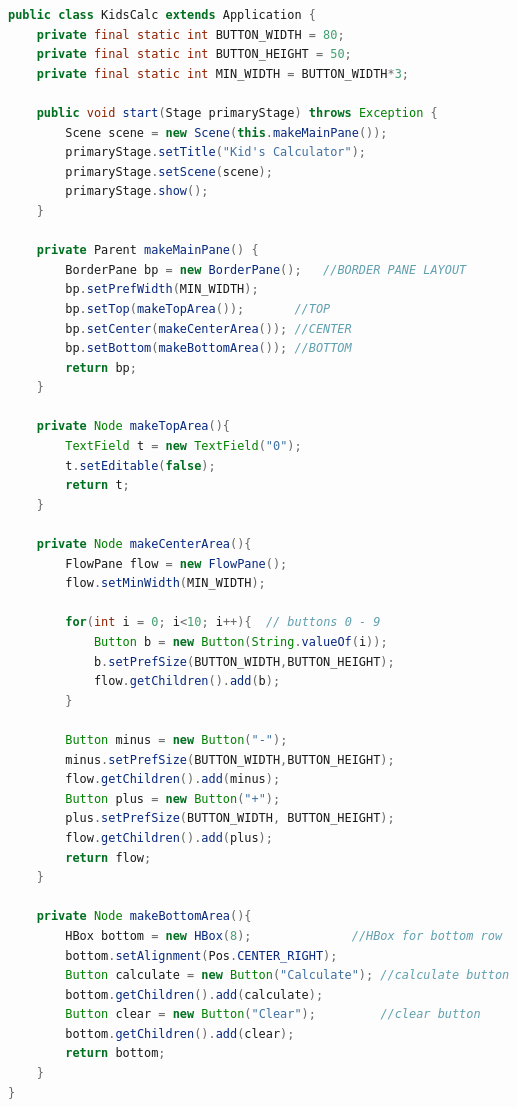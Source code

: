\vspace{-48pt}
\begin{answer}
\begin{lstlisting}[language=java,basicstyle=\scriptsize]
public class KidsCalc extends Application {
    private final static int BUTTON_WIDTH = 80;
    private final static int BUTTON_HEIGHT = 50;
    private final static int MIN_WIDTH = BUTTON_WIDTH*3;

    public void start(Stage primaryStage) throws Exception {
        Scene scene = new Scene(this.makeMainPane());
        primaryStage.setTitle("Kid's Calculator");
        primaryStage.setScene(scene);
        primaryStage.show();
    }

    private Parent makeMainPane() {
        BorderPane bp = new BorderPane();	//BORDER PANE LAYOUT
        bp.setPrefWidth(MIN_WIDTH);
        bp.setTop(makeTopArea()); 		//TOP
        bp.setCenter(makeCenterArea());	//CENTER
        bp.setBottom(makeBottomArea());	//BOTTOM
        return bp;
    }

    private Node makeTopArea(){
        TextField t = new TextField("0");
        t.setEditable(false);
        return t;
    }

    private Node makeCenterArea(){
        FlowPane flow = new FlowPane();
        flow.setMinWidth(MIN_WIDTH);
        
        for(int i = 0; i<10; i++){	// buttons 0 - 9
            Button b = new Button(String.valueOf(i));
            b.setPrefSize(BUTTON_WIDTH,BUTTON_HEIGHT);
            flow.getChildren().add(b);
        }
        
        Button minus = new Button("-"); 
        minus.setPrefSize(BUTTON_WIDTH,BUTTON_HEIGHT);
        flow.getChildren().add(minus);
        Button plus = new Button("+");
        plus.setPrefSize(BUTTON_WIDTH, BUTTON_HEIGHT);
        flow.getChildren().add(plus);
        return flow;
    }

    private Node makeBottomArea(){
        HBox bottom = new HBox(8);				//HBox for bottom row
        bottom.setAlignment(Pos.CENTER_RIGHT);
        Button calculate = new Button("Calculate");	//calculate button
        bottom.getChildren().add(calculate);
        Button clear = new Button("Clear");			//clear button
        bottom.getChildren().add(clear);
        return bottom;
    }
}
\end{lstlisting}
\end{answer}
